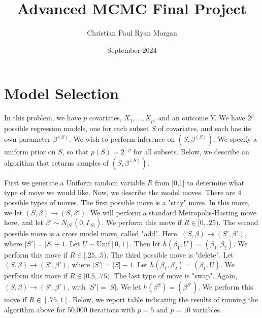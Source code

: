 \documentclass{article}
\title{Advanced MCMC Final Project}
\author{Christian Paul Ryan Morgan }
\date{September 2024}
\begin{document}
\maketitle

\section{Model Selection} 

In this problem, we have $p$ covariates, $X_1, \ldots, X_p$, and an outcome $Y$. We have $2^p$ possible regression models, one for each subset $S$ of covariates, and each has its own parameter $\beta^{(S)}$. We wish to perform inference on $(S, \beta^{(S)})$.
We specify a uniform prior on $S$, so that $p(S) = 2^{-p}$ for all subsets.
Below, we describe an algorithm that returns samples of $(S, \beta^{(S)})$.

First we generate a Uniform random variable $R$ from [0,1] to determine what type of move we would like.
Now, we describe the model moves. There are 4 possible types of moves. 
The first possible move is a "stay" move. In this move, we let $(S, \beta) \to (S, \beta')$. We will perform a standard Metropolis-Hasting move here, and let $\beta' \sim N_{|S|}(0, I_{|S|})$. We perform this move if $R \in [0, .25)$.
The second possible move is a cross model move, called "add". Here, $(S, \beta) \to (S', \beta')$, where $|S'| = |S|+1$. Let $U \sim \text{Unif}[0,1]$. Then let $h(\beta_1, U) = (\beta_1, \beta_2)$. We perform this move if $R \in [.25, .5)$.
The third possible move is "delete". Let $(S, \beta) \to (S', \beta')$, where $|S'| = |S| - 1$. Let $h(\beta_1, \beta_2) = (\beta_1, U)$. We perform this move if $R \in [0.5, .75)$.
The last type of move is "swap". Again, $(S, \beta) \to (S', \beta')$, with $|S'| = |S|$. We let $h(\beta^S) = (\beta^{S'})$. We perform this move if $R \in [.75, 1]$.
Below, we report table indicating the results of running the algorithm above for 50,000 iterations with $p=5$ and $p=10$ variables.
\end{document}
